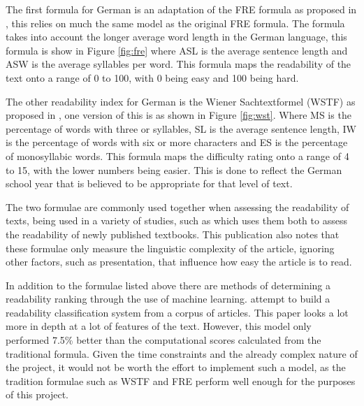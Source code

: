 The first formula for German is an adaptation of the FRE formula as proposed in \textcite{amstad1978}, this relies on much the same model as the original FRE formula. The formula takes into account the longer average word length in the German language, this formula is show in Figure \ref{fig:fre} where ASL is the average sentence length and ASW is the average syllables per word. This formula maps the readability of the text onto a range of 0 to 100, with 0 being easy and 100 being hard. 



The other readability index for German is the  Wiener Sachtextformel (WSTF) as proposed in \textcite{bamberger1984}, one version of this is as shown in Figure \ref{fig:wst}. Where MS is the percentage of words with three or syllables, SL is the average sentence length, IW is the percentage of words with six or more characters and ES is the percentage of monosyllabic words. This formula maps the difficulty rating onto a range of 4 to 15, with the lower numbers being easier. This is done to reflect the German school year that is believed to be appropriate for that level of text.



The two formulae are commonly used together when assessing the readability of texts, being used in a variety of studies, such as \textcite{rottensteiner2010} which uses them both to assess the readability of newly published textbooks. This publication also notes that these formulae only measure the linguistic complexity of the article, ignoring other factors, such as presentation, that influence how easy the article is to read. 

In addition to the formulae listed above there are methods of determining a readability ranking through the use of machine learning. \textcite{hancke2012} attempt to build a readability classification system from a corpus of articles. This paper looks a lot more in depth at a lot of features of the text. However, this model only performed 7.5\% better than the computational scores calculated from the traditional formula. Given the time constraints and the already complex nature of the project, it would not be worth the effort to implement such a model, as the tradition formulae such as WSTF and FRE perform well enough for the purposes of this project. 